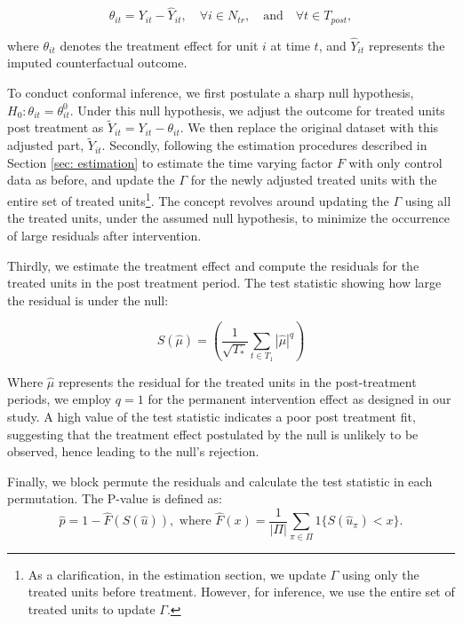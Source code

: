\documentclass[12pt]{article}
\begin{document}
\begin{equation*}
\theta_{it} = Y_{it} - \hat{Y}_{it}, \quad \forall i \in N_{tr}, \quad \text{and} \quad \forall t \in T_{post},
\end{equation*}

\noindent where $\theta_{it}$ denotes the treatment effect for unit $i$ at time $t$, and $\hat{Y}_{it}$ represents the imputed counterfactual outcome. 
    
To conduct conformal inference, we first postulate a sharp null hypothesis, $H_0: \theta_{it} = \theta_{it}^0$. Under this null hypothesis, we adjust the outcome for treated units post treatment as $\tilde{Y}_{it} = Y_{it} - \theta_{it}$. We then replace the original dataset with this adjusted part, $\tilde{Y}_{it}$. Secondly, following the estimation procedures described in Section \ref{sec: estimation} to estimate the time varying factor $F$ with only control data as before, and update the $\Gamma$ for the newly adjusted treated units with the entire set of treated units\footnote{As a clarification, in the estimation section, we update $\Gamma$ using only the treated units before treatment. However, for inference, we use the entire set of treated units to update 
$\Gamma$.}. The concept revolves around updating the $\Gamma$ using all the treated units, under the assumed null hypothesis, to minimize the occurrence of large residuals after intervention.

Thirdly, we estimate the treatment effect and compute the residuals for the treated units in the post treatment period. The test statistic showing how large the residual is under the null:

\begin{equation}
S(\hat{\mu}) = \left(\frac{1}{\sqrt{T_*}}\sum_{t \in T_1} |\hat{\mu}|^q \right)
\end{equation}

Where $\hat{\mu}$ represents the residual for the treated units in the post-treatment periods, we employ $q=1$ for the permanent intervention effect as designed in our study. A high value of the test statistic indicates a poor post treatment fit, suggesting that the treatment effect postulated by the null is unlikely to be observed, hence leading to the null's rejection. 

Finally, we block permute the residuals and calculate the test statistic in each permutation. The P-value is defined as:
\begin{equation}
\hat{p} = 1 - \hat{F}(S(\hat{u})), \text{ where } \hat{F}(x) = \frac{1}{|\Pi|} \sum_{\pi \in \Pi} 1\{S(\hat{u}_\pi) < x\}.
\end{equation}
\end{document}
